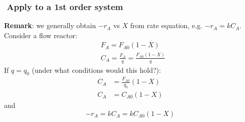 \begin{comment}
	(c) Sketch of $X$ and $-r_A$ vs V?
	\begin{itemize}
		\item[(i)] Fix $X$, say $X = 0.2$
		\item[(ii)] Calculate $$V = F_{A0}\int_0^{0.2}\frac{dX}{-r_A}\approx218\text{dm}^3$$
		\item[(iii)] Increment $X$ and calculate new $V$, etc.
		\begin{table}
			\centering
			\begin{tabular}
				{|c|c|c|c} \hline $X$ & 0 & 0.2 & 0.4\\
				$-r_A$ & 0.45 & 0.30 &\\
				$V$ & 0 & 218 &\\
				\hline
			\end{tabular}
			$\leftarrow$ Given data,
		\end{table}
	\end{itemize}
\end{frame}

\begin{frame}\frametitle{PFR example}
	\begin{itemize}
		\item	{\color{blue}Ex 2-4} Comparison of CSTR and PFR sizes

		In general -

		For isothermal reactions of order $>$ zero, $-\frac{1}{r_A}$ vs $X$ curve is concave ??.

		\item	$\Rightarrow$ PFR will require a smaller volume than CSTR for same feed rate.
	\end{itemize}
\end{frame}
\end{comment}

\begin{frame}\frametitle{{}\,\,{\large Apply to a 1st order system}}
	\textbf{Remark}: we generally obtain $-r_A$ vs $X$ from rate equation, e.g. $-r_A = kC_A$. Consider a flow reactor:
	\begin{align*}
		&F_A = F_{A0}(1 - X)\\
		&C_A = \frac{F_A}{q} = \frac{F_{A0}(1 - X)}{q}
	\end{align*}
	If $q = q_0$ {\color{myGreen}(under what conditions would this hold?)}:
	\begin{align*}
		C_A &= \frac{F_{A0}}{q_0}(1 - X)\\
		C_A &= C_{A0}(1 - X)
	\end{align*}
	and $$-r_A = k C_A = kC_{A0}(1 - X)$$
\end{frame}

